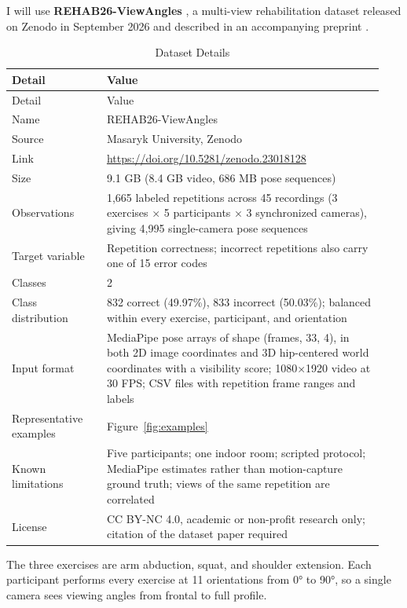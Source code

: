 I will use \textbf{REHAB26-ViewAngles} \parencite{janosova2026dataset}, a multi-view rehabilitation dataset released on Zenodo in September 2026 and described in an accompanying preprint \parencite{janosova2026orientation}.

\begin{longtable}{L{0.24\linewidth} L{0.70\linewidth}}
\caption{Dataset Details}\label{tab:dataset}\\
\toprule
Detail & Value \\
\midrule
\endfirsthead
\toprule
Detail & Value \\
\midrule
\endhead
\bottomrule
\endlastfoot
Name & REHAB26-ViewAngles \\
Source & Masaryk University, Zenodo \\
Link & \url{https://doi.org/10.5281/zenodo.23018128} \\
Size & 9.1 GB (8.4 GB video, 686 MB pose sequences) \\
Observations & 1,665 labeled repetitions across 45 recordings (3 exercises × 5 participants × 3 synchronized cameras), giving 4,995 single-camera pose sequences \\
Target variable & Repetition correctness; incorrect repetitions also carry one of 15 error codes \\
Classes & 2 \\
Class distribution & 832 correct (49.97\%), 833 incorrect (50.03\%); balanced within every exercise, participant, and orientation \\
Input format & MediaPipe pose arrays of shape (frames, 33, 4), in both 2D image coordinates and 3D hip-centered world coordinates with a visibility score; 1080×1920 video at 30 FPS; CSV files with repetition frame ranges and labels \\
Representative examples & Figure~\ref{fig:examples} \\
Known limitations & Five participants; one indoor room; scripted protocol; MediaPipe estimates rather than motion-capture ground truth; views of the same repetition are correlated \\
License & CC BY-NC 4.0, academic or non-profit research only; citation of the dataset paper required \\
\end{longtable}

The three exercises are arm abduction, squat, and shoulder extension. Each participant performs every exercise at 11 orientations from 0° to 90°, so a single camera sees viewing angles from frontal to full profile.

